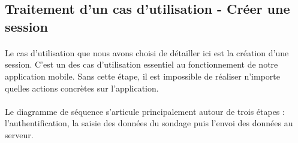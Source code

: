 \documentclass[titlepage, 12pt]{report}
\begin{document}
\subsection{Traitement d'un cas d'utilisation - Créer une session}

\paragraph{}Le cas d'utilisation que nous avons choisi de détailler ici est la création d'une session. C'est un des cas d'utilisation essentiel au fonctionnement de notre application mobile. Sans cette étape, il est impossible de réaliser n'importe quelles actions concrètes sur l'application.
\paragraph{}Le diagramme de séquence s'articule principalement autour de trois étapes : l'authentification, la saisie des données du sondage puis l'envoi des données au serveur.

\end{document}
